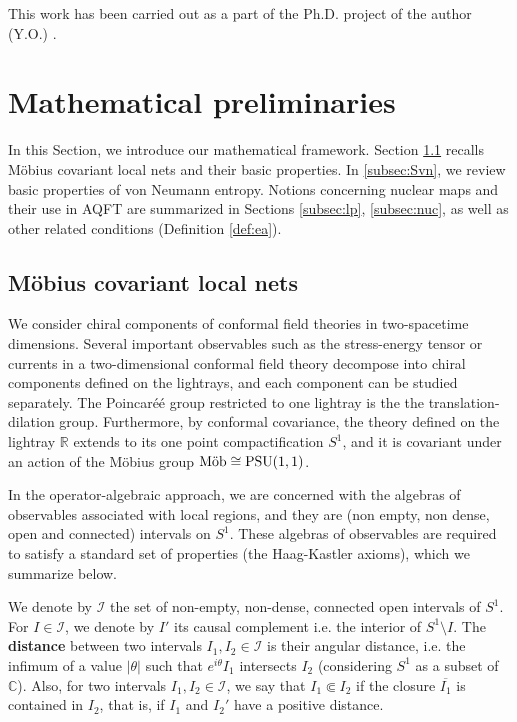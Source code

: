 \documentclass[a4paper,12pt]{article}
\theoremstyle{plain}
\theoremstyle{definition}
\theoremstyle{remark}
\newcommand{\Mob}{{\rm M\ddot{o}b}}
\def\RR{{\mathbb R}}
\def\CC{{\mathbb C}}
\begin{document}
This work has been carried out as a part of the Ph.D.\! project of the author (Y.O.) \cite{Otani17}.


\section{Mathematical preliminaries}\label{sec:math}
In this Section, we introduce our mathematical framework.
Section \ref{subsec:net} recalls M\"obius covariant local nets and their basic properties.
In \ref{subsec:Svn}, we review basic properties of von Neumann entropy.
Notions concerning nuclear maps and their use in AQFT are summarized in Sections \ref{subsec:lp}, \ref{subsec:nuc},
as well as other related conditions (Definition \ref{def:ea}).


\subsection{M\"obius covariant local nets}
\label{subsec:net}
We consider chiral components of conformal field theories in two-spacetime dimensions.
Several important observables such as the stress-energy tensor or currents in a two-dimensional conformal field theory
decompose into chiral components defined on the lightrays, and each component can be studied separately.
The Poincar\'eé group restricted to one lightray is the the translation-dilation group.
Furthermore, by conformal covariance, the theory defined on the lightray $\RR$ extends to its one point compactification $S^1$,
and it is covariant under an action of the M\"obius group $\Mob \cong \mathrm{PSU}(1,1)$.

In the operator-algebraic approach, we are concerned with the algebras of observables associated with
local regions, and they are (non empty, non dense, open and connected) intervals on $S^1$.
These algebras of observables are required to satisfy a standard set of properties (the Haag-Kastler axioms),
which we summarize below.

We denote by $\mathcal{I}$ the set of non-empty, non-dense, connected open intervals of $S^1$.
For $I\in\mathcal{I}$, we denote by $I'$ its causal complement i.e.\! the interior of $S^1\setminus I$.
The {\bf distance} between two intervals $I_1,I_2\in\mathcal{I}$ is their angular distance,
i.e.\! the infimum of a value $|\theta|$ such that $e^{i\theta}I_1$ intersects $I_2$
(considering $S^1$ as a subset of $\CC$).
Also, for two intervals $I_1,I_2\in\mathcal{I}$, we say that $I_1 \Subset I_2$ if the closure $\overline{I_1}$ is contained in $I_2$, that is, if $I_1$ and $I_2'$ have a positive distance. 
\end{document}
